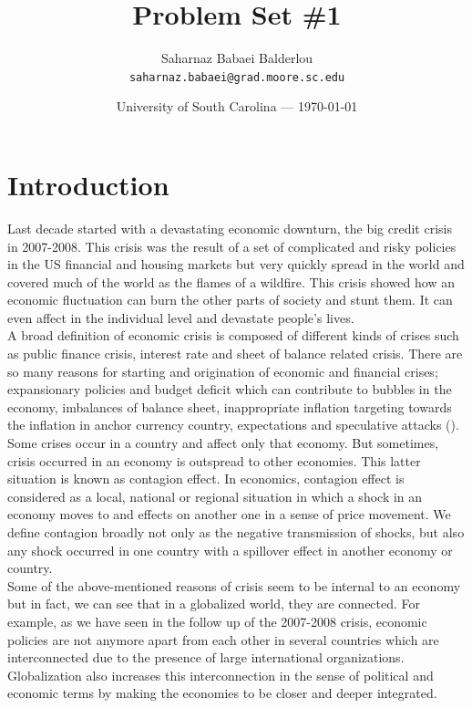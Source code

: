 \documentclass{article}
\title{Problem Set \#1} %
\author{Saharnaz Babaei Balderlou\\ \texttt{saharnaz.babaei@grad.moore.sc.edu}} %
\date{University of South Carolina --- \today} %
\begin{document}
\maketitle %


\section*{Introduction} %
Last decade started with a devastating economic downturn, the big credit crisis in 2007-2008. This crisis was the result of a set of complicated and risky policies in the US financial and housing markets but very quickly spread in the world and covered much of the world as the flames of a wildfire. This crisis showed how an economic fluctuation can burn the other parts of society and stunt them. It can even affect in the individual level and devastate people’s lives.\\
A broad definition of economic crisis is composed of different kinds of crises such as public finance crisis, interest rate and sheet of balance related crisis. There are so many reasons for starting and origination of economic and financial crises; expansionary policies and budget deficit which can contribute to bubbles in the economy, imbalances of balance sheet, inappropriate inflation targeting towards the inflation in anchor currency country, expectations and speculative attacks (\cite{billio2005multivariate}). \\
Some crises occur in a country and affect only that economy. But sometimes, crisis occurred in an economy is outspread to other economies. This latter situation is known as contagion effect. In economics, contagion effect is considered as a local, national or regional situation in which a shock in an economy moves to and effects on another one in a sense of price movement. We define contagion broadly not only as the negative transmission of shocks, but also any shock occurred in one country with a spillover effect in another economy or country. \\
Some of the above-mentioned reasons of crisis seem to be internal to an economy but in fact, we can see that in a globalized world, they are connected. For example, as we have seen in the follow up of the 2007-2008 crisis, economic policies are not anymore apart from each other in several countries which are interconnected due to the presence of large international organizations. Globalization also increases this interconnection in the sense of political and economic terms by making the economies to be closer and deeper integrated.  \\
\end{document}
